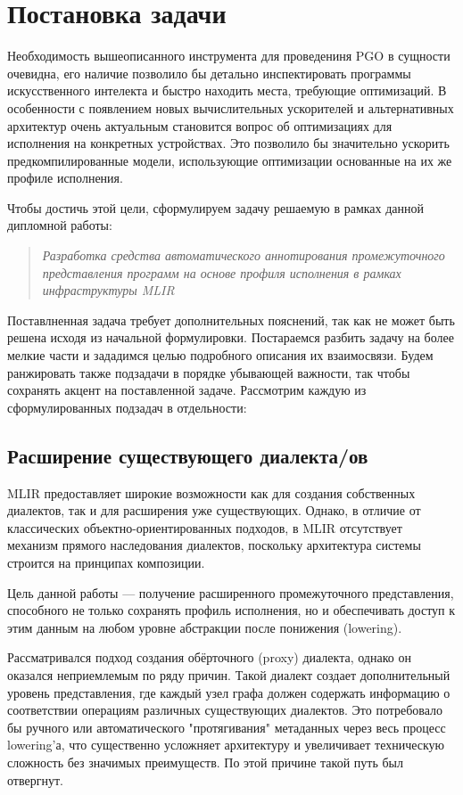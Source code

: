 \section{Постановка задачи}
\label{sec:Chapter1} 

Необходимость вышеописанного инструмента для проведениня PGO в сущности очевидна, его наличие позволило бы детально инспектировать программы искусственного интелекта и быстро находить места, требующие оптимизаций.
В особенности с появлением новых вычислительных ускорителей и альтернативных архитектур очень актуальным становится вопрос об оптимизациях для исполнения на конкретных устройствах.
Это позволило бы значительно ускорить предкомпилированные модели, использующие оптимизации основанные на их же профиле исполнения.

Чтобы достичь этой цели, сформулируем задачу решаемую в рамках данной дипломной работы:

\begin{quote}
\textit{Разработка средства автоматического аннотирования промежуточного представления программ на основе профиля исполнения в рамках инфраструктуры MLIR}
\end{quote}

Поставлненная задача требует дополнительных пояснений, так как не может быть решена исходя из начальной формулировки.
Постараемся разбить задачу на более мелкие части и зададимся целью подробного описания их взаимосвязи.
Будем ранжировать также подзадачи в порядке убывающей важности, так чтобы сохранять акцент на поставленной задаче.
Рассмотрим каждую из сформулированных подзадач в отдельности:

\subsection{Расширение существующего диалекта/ов}

MLIR предоставляет широкие возможности как для создания собственных диалектов, так и для расширения уже существующих.
Однако, в отличие от классических объектно-ориентированных подходов, в MLIR отсутствует механизм прямого наследования диалектов, поскольку архитектура системы строится на принципах композиции.

Цель данной работы — получение расширенного промежуточного представления, способного не только сохранять профиль исполнения, но и обеспечивать доступ к этим данным на любом уровне абстракции после понижения (lowering).

Рассматривался подход создания обёрточного (proxy) диалекта, однако он оказался неприемлемым по ряду причин. Такой диалект создает дополнительный уровень представления, где каждый узел графа должен содержать информацию о соответствии операциям различных существующих диалектов.
Это потребовало бы ручного или автоматического "протягивания" метаданных через весь процесс lowering'а, что существенно усложняет архитектуру и увеличивает техническую сложность без значимых преимуществ.
По этой причине такой путь был отвергнут.

